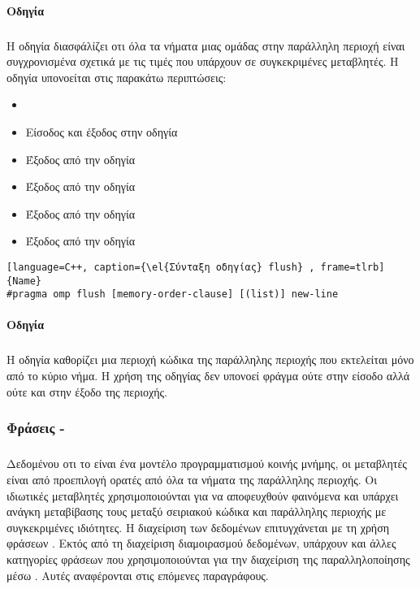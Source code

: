 \paragraph{Οδηγία \emph{}}
\subparagraph{}
Η οδηγία \textbf{} διασφάλίζει οτι όλα τα νήματα μιας ομάδας στην παράλληλη περιοχή είναι συγχρονισμένα
σχετικά με τις τιμές που υπάρχουν σε συγκεκριμένες μεταβλητές. Η οδηγία \emph{} υπονοείται στις παρακάτω
περιπτώσεις\cite{ibm_flush}:
\begin{itemize}
\item{\emph{}}
\item{Είσοδος και έξοδος στην οδηγία \emph{}}
\item{Έξοδος από την οδηγία \emph{}}
\item{Έξοδος από την οδηγία \emph{}}
\item{Έξοδος από την οδηγία \emph{}}
\item{Έξοδος από την οδηγία \emph{}}
\end{itemize}

\begin{lstlisting}[language=C++, caption={\el{Σύνταξη οδηγίας} flush} , frame=tlrb]{Name} 
#pragma omp flush [memory-order-clause] [(list)] new-line

\end{lstlisting}

\clearpage
\paragraph{Οδηγία \emph{}}
\subparagraph{}
Η οδηγία \emph{} καθορίζει μια περιοχή κώδικα της παράλληλης περιοχής που εκτελείται μόνο από το κύριο νήμα.
Η χρήση της οδηγίας δεν υπονοεί φράγμα ούτε στην είσοδο αλλά ούτε και στην έξοδο της περιοχής\cite{ibm_master}.


\clearpage
\subsubsection{Φράσεις - }
\subparagraph{}
Δεδομένου οτι το \emph{} είναι ένα μοντέλο προγραμματισμού κοινής μνήμης, οι μεταβλητές είναι από προεπιλογή
ορατές από όλα τα νήματα της παράλληλης περιοχής. Οι ιδιωτικές μεταβλητές χρησιμοποιούνται για να
αποφευχθούν φαινόμενα \emph{} και υπάρχει ανάγκη μεταβίβασης τους μεταξύ σειριακού κώδικα και
παράλληλης περιοχής με συγκεκριμένες ιδιότητες. Η διαχείριση των δεδομένων επιτυγχάνεται με τη χρήση φράσεων
\textbf{}. Εκτός από τη διαχείριση διαμοιρασμού δεδομένων, υπάρχουν και άλλες κατηγορίες φράσεων που
χρησιμοποιούνται για την διαχείριση της παραλληλοποίησης μέσω \emph{}. Αυτές αναφέρονται στις επόμενες
παραγράφους.
\ \\

